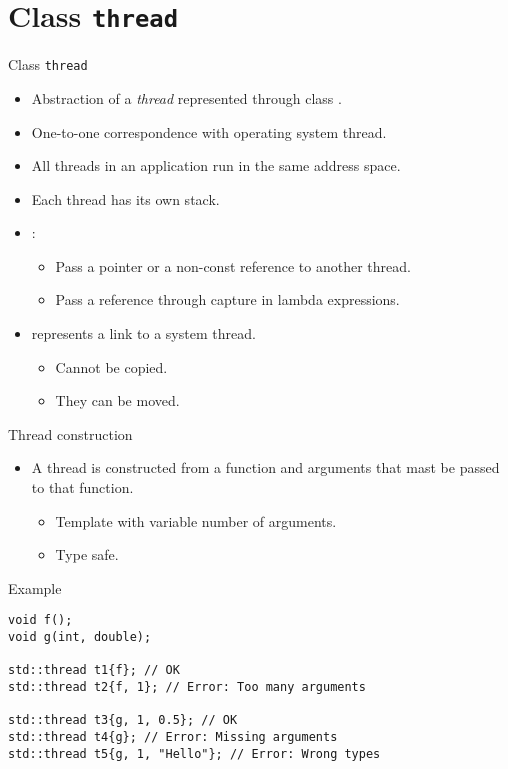 \section{Class \texttt{thread}}

\begin{frame}[t]{Class \texttt{thread}}
\begin{itemize}
  \item Abstraction of a \emph{thread} represented through class .
  \item One-to-one correspondence with operating system thread.
  \item All threads in an application run in the same address space.
  \item Each thread has its own stack.
  \item {}:
    \begin{itemize}
      \item Pass a pointer or a non-const reference to another thread.
      \item Pass a reference through capture in lambda expressions.
    \end{itemize}
  \item {} represents a link to a system thread.
    \begin{itemize}
      \item Cannot be copied.
      \item They can be moved.
    \end{itemize}
\end{itemize}
\end{frame}

\begin{frame}[t,fragile]{Thread construction}
\begin{itemize}
  \item A thread is constructed from a function and arguments that mast be passed to that function.
    \begin{itemize}
      \item Template with variable number of arguments.
      \item Type safe.
    \end{itemize}
\end{itemize}
\begin{block}{Example}
\begin{lstlisting}
void f();
void g(int, double);

std::thread t1{f}; // OK
std::thread t2{f, 1}; // Error: Too many arguments

std::thread t3{g, 1, 0.5}; // OK
std::thread t4{g}; // Error: Missing arguments
std::thread t5{g, 1, "Hello"}; // Error: Wrong types
\end{lstlisting}
\end{block}
\end{frame}

